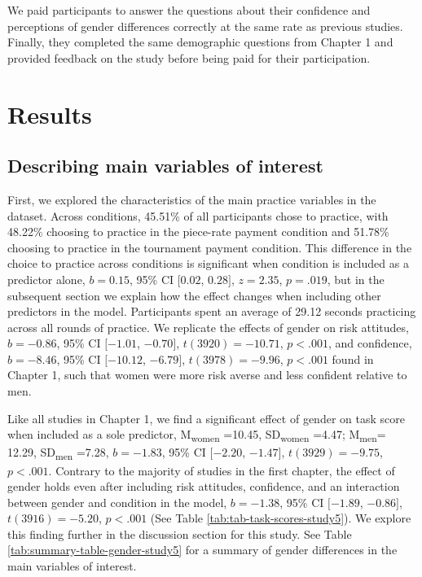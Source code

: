 \documentclass[letterpaper, nobind]{templates/ociamthesis}
\begin{document}
We paid participants to answer the questions about their confidence and perceptions of gender differences correctly at the same rate as previous studies. Finally, they completed the same demographic questions from Chapter 1 and provided feedback on the study before being paid for their participation.

\hypertarget{results-3}{%
\section{Results}\label{results-3}}

\hypertarget{describing-main-variables-of-interest-3}{%
\subsection{Describing main variables of interest}\label{describing-main-variables-of-interest-3}}

First, we explored the characteristics of the main practice variables in the dataset. Across conditions, 45.51\% of all participants chose to practice, with 48.22\% choosing to practice in the piece-rate payment condition and 51.78\% choosing to practice in the tournament payment condition. This difference in the choice to practice across conditions is significant when condition is included as a predictor alone, \(b = 0.15\), 95\% CI \([0.02\), \(0.28]\), \(z = 2.35\), \(p = .019\), but in the subsequent section we explain how the effect changes when including other predictors in the model. Participants spent an average of 29.12 seconds practicing across all rounds of practice. We replicate the effects of gender on risk attitudes, \(b = -0.86\), 95\% CI \([-1.01\), \(-0.70]\), \(t(3920) = -10.71\), \(p < .001\), and confidence, \(b = -8.46\), 95\% CI \([-10.12\), \(-6.79]\), \(t(3978) = -9.96\), \(p < .001\) found in Chapter 1, such that women were more risk averse and less confident relative to men.

Like all studies in Chapter 1, we find a significant effect of gender on task score when included as a sole predictor, M\textsubscript{women} =10.45, SD\textsubscript{women} =4.47; M\textsubscript{men}= 12.29, SD\textsubscript{men} =7.28, \(b = -1.83\), 95\% CI \([-2.20\), \(-1.47]\), \(t(3929) = -9.75\), \(p < .001\). Contrary to the majority of studies in the first chapter, the effect of gender holds even after including risk attitudes, confidence, and an interaction between gender and condition in the model, \(b = -1.38\), 95\% CI \([-1.89\), \(-0.86]\), \(t(3916) = -5.20\), \(p < .001\) (See Table \ref{tab:tab-task-scores-study5}). We explore this finding further in the discussion section for this study. See Table \ref{tab:summary-table-gender-study5} for a summary of gender differences in the main variables of interest.
\end{document}
